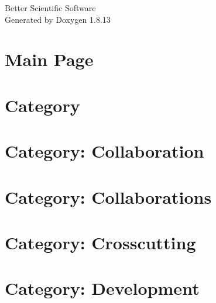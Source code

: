 \documentclass[twoside]{book}
\newcommand{\+}{\discretionary{\mbox{\scriptsize$\hookleftarrow$}}{}{}}
\newcommand{\clearemptydoublepage}{%
  \newpage{\pagestyle{empty}\cleardoublepage}%
}
\begin{document}
\hypersetup{pageanchor=false,
             bookmarksnumbered=true,
             pdfencoding=unicode
            }
\begin{titlepage}
\vspace*{7cm}
\begin{center}%
{\Large Better Scientific Software }\\
\vspace*{1cm}
{\large Generated by Doxygen 1.8.13}\\
\end{center}
\end{titlepage}
\clearemptydoublepage
{}
\tableofcontents
\clearemptydoublepage
{}
\hypersetup{pageanchor=true}

\chapter{Main Page}
\label{index}\hypertarget{index}{}
\chapter{Category}
\label{md_markdown_category}

\chapter{Category\+: Collaboration}
\label{md_markdown_category_collaboration}

\chapter{Category\+: Collaborations}
\label{md_markdown_category_collaborations}

\chapter{Category\+: Crosscutting}
\label{md_markdown_category_crosscutting}

\chapter{Category\+: Development}
\label{md_markdown_category_development}

\end{document}
